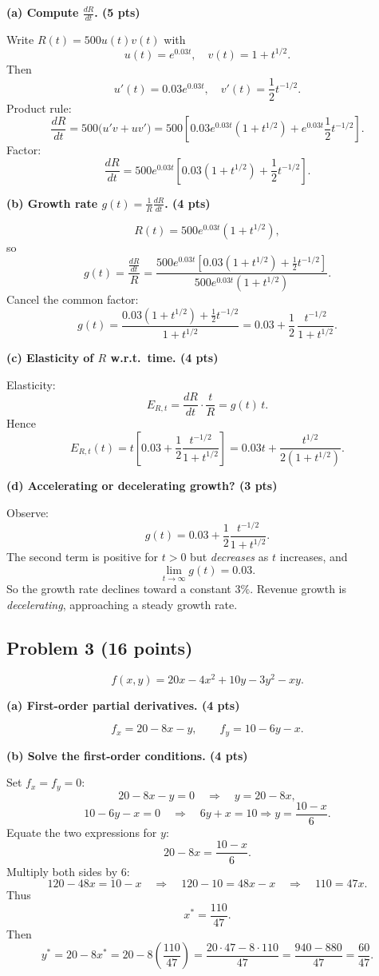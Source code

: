 \documentclass[12pt]{article}
\begin{document}
\textbf{(a) Compute \(\frac{dR}{dt}\). (5 pts)}

Write \(R(t) = 500 u(t) v(t)\) with
\[
u(t) = e^{0.03 t}, \quad v(t) = 1 + t^{1/2}.
\]
Then
\[
u'(t) = 0.03 e^{0.03 t},\quad v'(t) = \frac{1}{2} t^{-1/2}.
\]
Product rule:
\[
\frac{dR}{dt} = 500 \big(u'v + uv'\big)
= 500\left[0.03 e^{0.03 t}(1+t^{1/2}) + e^{0.03 t}\frac{1}{2}t^{-1/2}\right].
\]
Factor:
\[
\frac{dR}{dt} 
= 500 e^{0.03 t}\left[0.03(1+t^{1/2}) + \frac{1}{2}t^{-1/2}\right].
\]

\textbf{(b) Growth rate \(g(t) = \frac{1}{R}\frac{dR}{dt}\). (4 pts)}

\[
R(t) = 500 e^{0.03 t}(1+t^{1/2}),
\]
so
\[
g(t) 
= \frac{\frac{dR}{dt}}{R}
= \frac{500 e^{0.03 t}\left[0.03(1+t^{1/2}) + \frac{1}{2}t^{-1/2}\right]}{500 e^{0.03 t} (1+t^{1/2})}.
\]
Cancel the common factor:
\[
g(t)
= \frac{0.03(1+t^{1/2}) + \frac{1}{2}t^{-1/2}}{1+t^{1/2}}
= 0.03 + \frac{1}{2}\, \frac{t^{-1/2}}{1+t^{1/2}}.
\]

\textbf{(c) Elasticity of \(R\) w.r.t.\ time. (4 pts)}

Elasticity:
\[
E_{R,t} = \frac{dR}{dt}\cdot \frac{t}{R} = g(t)\, t.
\]
Hence
\[
E_{R,t}(t) 
= t\left[0.03 + \frac{1}{2}\frac{t^{-1/2}}{1+t^{1/2}}\right]
= 0.03 t + \frac{t^{1/2}}{2(1+t^{1/2})}.
\]

\textbf{(d) Accelerating or decelerating growth? (3 pts)}

Observe:
\[
g(t) = 0.03 + \frac{1}{2}\frac{t^{-1/2}}{1+t^{1/2}}.
\]
The second term is positive for \(t>0\) but \emph{decreases} as \(t\) increases, and
\[
\lim_{t\to\infty} g(t) = 0.03.
\]
So the growth rate declines toward a constant \(3\%\). Revenue growth is \emph{decelerating}, approaching a steady growth rate.

\bigskip

\subsection*{Problem 3 (16 points)}

\[
f(x,y)=20x - 4x^2 + 10y - 3y^2 - xy.
\]

\textbf{(a) First-order partial derivatives. (4 pts)}

\[
f_x = 20 - 8x - y,
\qquad
f_y = 10 - 6y - x.
\]

\textbf{(b) Solve the first-order conditions. (4 pts)}

Set \(f_x=f_y=0\):
\[
20 - 8x - y = 0 \quad \Rightarrow \quad y = 20 - 8x,
\]
\[
10 - 6y - x = 0 \quad \Rightarrow \quad 6y + x = 10 \Rightarrow y = \frac{10 - x}{6}.
\]
Equate the two expressions for \(y\):
\[
20 - 8x = \frac{10 - x}{6}.
\]
Multiply both sides by 6:
\[
120 - 48x = 10 - x
\quad\Rightarrow\quad
120 - 10 = 48x - x
\quad\Rightarrow\quad
110 = 47x.
\]
Thus
\[
x^\ast = \frac{110}{47}.
\]
Then
\[
y^\ast = 20 - 8x^\ast
= 20 - 8\left(\frac{110}{47}\right)
= \frac{20\cdot 47 - 8\cdot 110}{47}
= \frac{940 - 880}{47}
= \frac{60}{47}.
\]
\end{document}
